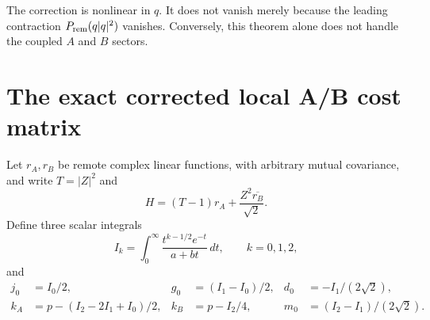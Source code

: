 \documentclass[11pt]{article}
\begin{document}
The correction is nonlinear in $q$. It does not vanish merely because the
leading contraction $P_{\rm rem}(q|q|^2)$ vanishes. Conversely, this theorem
alone does not handle the coupled $A$ and $B$ sectors.

\section{The exact corrected local A/B cost matrix}
Let $r_A,r_B$ be remote complex linear functions, with arbitrary mutual
covariance, and write $T=|Z|^2$ and
\[
 H=(T-1)r_A+\frac{Z^2\overline{r_B}}{\sqrt2}.
\]
Define three scalar integrals
\[
 I_k=\int_0^\infty\frac{t^{k-1/2}e^{-t}}{a+bt}\,dt,
 \qquad k=0,1,2,
\]
and
\begin{align*}
 j_0&=I_0/2,&g_0&=(I_1-I_0)/2,&d_0&=-I_1/(2\sqrt2),\\
 k_A&=p-(I_2-2I_1+I_0)/2,&
 k_B&=p-I_2/4,&m_0&=(I_2-I_1)/(2\sqrt2).
\end{align*}
\end{document}

